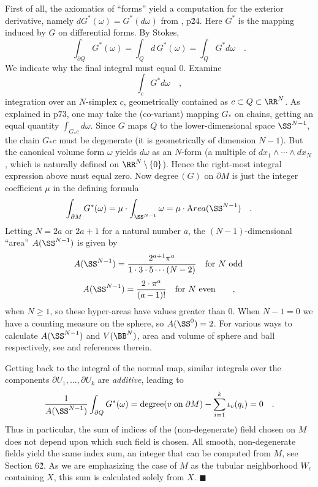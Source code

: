 First of all, the axiomatics of ``forms'' yield a computation for the exterior derivative, namely $dG^*(\omega) = G^*(d\omega)$ from \cite{Flanders}, p\. 24.  Here $G^*$ is the mapping induced by $G$ on differential forms. By Stokes,
$$\int_{\partial Q} G^*(\omega) = \int_Q d \,G^*(\omega) = \int_Q G^* d \omega\quad .$$
We indicate why the final integral must equal $0$. Examine $$\int_c G^* d\omega \quad ,$$ integration over an $N$-simplex $c$, geometrically contained as $c \subset Q \subset \RR^N$. As explained in \cite{Flanders} p\. 73, one may take the (co-variant) mapping $G_*$ on chains, getting an equal quantity $\int_{G_* c} d\omega$. Since $G$ maps $Q$ to the lower-dimensional space $\SS^{N - 1}$, the chain $G_* c$ must be degenerate (it is geometrically of dimension $N - 1$). But the canonical volume form $\omega$ yields $d\omega$ as an $N$-form (a multiple of $dx_1 \wedge \cdots \wedge dx_N$, which is naturally defined on $\RR^N \,\backslash \,\{0\}$). Hence the right-most integral expression above must equal zero. 
\bigskip
Now degree$\,(G)$ on $\partial M$ is just the integer coefficient $\mu$ in the defining formula
$$\int_{\partial M} G^*(\omega) = \mu \cdot \int_{\SS^{N - 1}} \omega = \mu \cdot {\text Area} (\SS^{N - 1})\quad .$$
Letting $N = 2a$ or $2a+1$ for a natural number $a$, the $(N - 1)$-dimensional ``area'' $A(\SS^{N - 1})$ is given by
$$A(\SS^{N-1}) = \frac{2^{a+1} \pi^a}{1\cdot 3\cdot 5 \cdots (N - 2)}\quad \text{for $N$ odd}\,$$
$$A(\SS^{N - 1}) = \frac{2 \cdot \pi^a}{(a - 1)!}\quad \text{for $N$ even}\qquad ,$$
when $N \geq 1$, so these hyper-areas have values greater than $0$. When
$N - 1 = 0$ we have a counting measure on the sphere, so $A (\SS^0) = 2$. For various ways to calculate $A( \SS^{N - 1})$ and $V(\BB^N)$, area and volume of sphere and ball respectively, see \cite{XWang} and references therein.

Getting back to the integral of the normal map, similar integrals over the components $\partial U_1,\dotsc , \partial U_k$ are {\it additive}, leading to
$$\frac{1}{A(\SS^{N-1})} \int_{\partial Q}G^*(\omega) = \text{degree}(v\;\text{on}\;\partial M) -
\sum_{i=1}^k \iota_v (q_i) = 0\quad .$$
Thus in particular, the sum of indices of the (non-degenerate) field chosen on $M$ does not depend upon which such field is chosen. All smooth, non-degenerate fields yield the same index sum, an integer that can be computed from $M$, see \cite{Flanders} Section 6\.2. As we are emphasizing the case of $M$ as the tubular neighborhood $W_\epsilon$ containing $X$, this sum is calculated solely from $X$. \hfill $\blacksquare$


